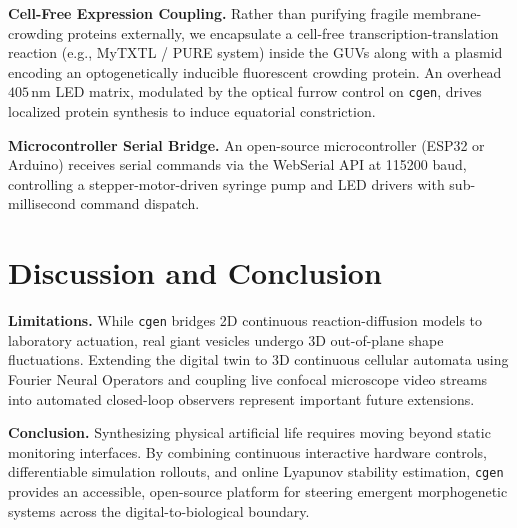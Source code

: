 \documentclass[letterpaper]{article}
\begin{document}
\textbf{Cell-Free Expression Coupling.} Rather than purifying fragile membrane-crowding proteins externally, we encapsulate a cell-free transcription-translation reaction (e.g., MyTXTL / PURE system) inside the GUVs along with a plasmid encoding an optogenetically inducible fluorescent crowding protein. An overhead $405\,\text{nm}$ LED matrix, modulated by the optical furrow control on \texttt{cgen}, drives localized protein synthesis to induce equatorial constriction.

\textbf{Microcontroller Serial Bridge.} An open-source microcontroller (ESP32 or Arduino) receives serial commands via the WebSerial API at 115200 baud, controlling a stepper-motor-driven syringe pump and LED drivers with sub-millisecond command dispatch.

\section{Discussion and Conclusion}

\textbf{Limitations.} While \texttt{cgen} bridges 2D continuous reaction-diffusion models to laboratory actuation, real giant vesicles undergo 3D out-of-plane shape fluctuations. Extending the digital twin to 3D continuous cellular automata using Fourier Neural Operators and coupling live confocal microscope video streams into automated closed-loop observers represent important future extensions.

\textbf{Conclusion.} Synthesizing physical artificial life requires moving beyond static monitoring interfaces. By combining continuous interactive hardware controls, differentiable simulation rollouts, and online Lyapunov stability estimation, \texttt{cgen} provides an accessible, open-source platform for steering emergent morphogenetic systems across the digital-to-biological boundary.

\footnotesize


\end{document}
